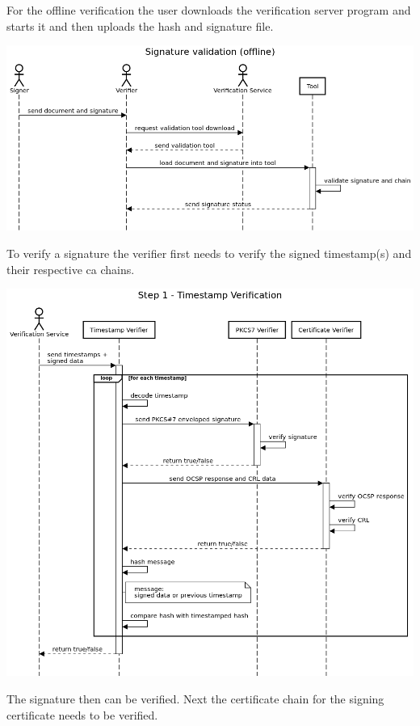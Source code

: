 For the offline verification the user downloads the verification server program and starts it and then uploads the hash and signature file.

\includegraphics[scale=0.5]{images/protocol_offline_verification_high_level.png}

To verify a signature the verifier first needs to verify the signed timestamp(s) and their respective ca chains.

\includegraphics[scale=0.5]{images/protocol_verification_step1_timestamp.png}

The signature then can be verified.
Next the certificate chain for the signing certificate needs to be verified.

